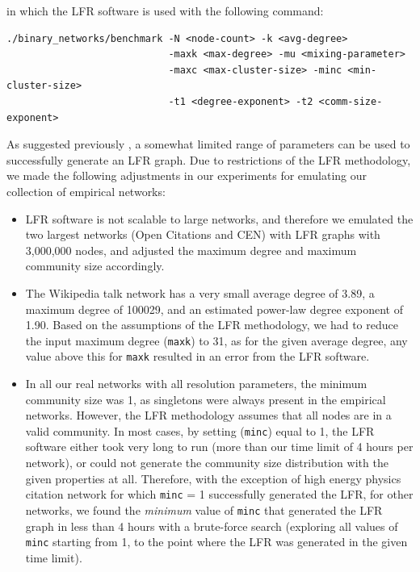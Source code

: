 \documentclass[a4paper]{article}   	%
\begin{document}
\noindent
in which the LFR software \citep{lancichinetti2008benchmark} is used with the following command:

\begin{lstlisting}[basicstyle=\ttfamily\small]
./binary_networks/benchmark -N <node-count> -k <avg-degree>
                            -maxk <max-degree> -mu <mixing-parameter>
                            -maxc <max-cluster-size> -minc <min-cluster-size>
                            -t1 <degree-exponent> -t2 <comm-size-exponent>
\end{lstlisting}



As suggested previously \citep{hagberg2008exploring}, a somewhat limited range of parameters can be used to successfully generate an LFR graph. Due to restrictions of the LFR methodology, we made the following adjustments in our experiments for emulating our collection of empirical networks:

\begin{itemize}
    \item LFR software is not scalable to large networks, and therefore we emulated the two largest networks (Open Citations and CEN) with LFR graphs with 3,000,000 nodes, and adjusted the maximum degree and maximum community size accordingly.
    \item The Wikipedia talk network has a very small average degree of 3.89, a maximum degree of 100029, and an estimated power-law degree exponent of 1.90. Based on the assumptions of the LFR methodology, we had to reduce the input maximum degree (\texttt{maxk}) to 31, as for the given average degree, any value above this for \texttt{maxk} resulted in an error from the LFR software.
    \item In all our real networks with all resolution parameters, the minimum community size was 1, as singletons were always present in the empirical networks. However, the LFR methodology assumes that all nodes are in a valid community. In most cases, by setting (\texttt{minc}) equal to 1, the LFR software either took very long to run (more than our time limit of 4 hours per network), or could not generate the community size distribution with the given properties at all. Therefore, with the exception of high energy physics citation network for which \texttt{minc} = 1 successfully generated the LFR, for other networks, we found the \textit{minimum} value of \texttt{minc} that generated the LFR graph in less than 4 hours with a brute-force search (exploring all values of \texttt{minc} starting from 1, to the point where the LFR was generated in the given time limit).
\end{itemize}
\end{document}
